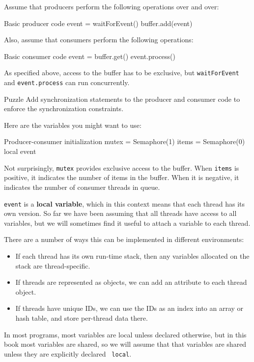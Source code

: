 Assume that producers perform the following operations over and
over:

\begin{lstbox}{Basic producer code}
event = waitForEvent()
buffer.add(event)
\end{lstbox}

Also, assume that consumers perform the following operations:

\begin{lstbox}{Basic consumer code}
event = buffer.get()
event.process()
\end{lstbox}

As specified above, access to the buffer has to be exclusive,
but {\tt waitForEvent} and {\tt event.process}
can run concurrently.

\begin{puzzlebox}{Puzzle}
Add synchronization statements to the producer and
consumer code to enforce the synchronization constraints.


Here are the variables you might want to use:

\begin{lstbox}{Producer-consumer initialization}
mutex = Semaphore(1)
items = Semaphore(0)
local event
\end{lstbox}

Not surprisingly, {\tt mutex} provides exclusive access to
the buffer.  When {\tt items} is positive, it indicates the
number of items in the buffer.  When it is negative, it
indicates the number of consumer threads in queue.

{\tt event} is a {\bf local variable}, which in this context means
that each thread has its own version.
So far we have been assuming that all threads have access
to all variables, but we will sometimes find it useful to
attach a variable to each thread.

There are a number of ways this can be implemented in different
environments:

\begin{itemize}

\item If each thread has its own run-time stack, then any variables
allocated on the stack are thread-specific.

\item If threads are represented as objects, we can add an attribute
to each thread object.

\item If threads have unique IDs, we can use the IDs as an index
into an array or hash table, and store per-thread data there.

\end{itemize}

In most programs, most variables are local unless declared otherwise,
but in this book most variables are shared, so we will assume that
that variables are shared unless they are explicitly declared {\tt
local}.
\end{puzzlebox}



